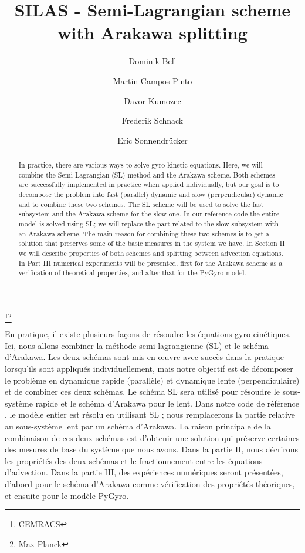 \documentclass[proc]{edpsmath}
\begin{document}
\title{SILAS - Semi-Lagrangian scheme with Arakawa splitting}
\thanks{CEMRACS}\thanks{Max-Planck}%
%
\author{Dominik Bell}\address{Max-Planck-Institut für Plasmaphysik, Garching, Germany; }
\author{Martin Campos Pinto}
\author{Davor Kumozec}\address{Faculty of Sciences, University of Novi Sad, Serbia; }
\author{Frederik Schnack}
\author{Eric Sonnendrücker}

\begin{abstract}
In practice, there are various ways to solve gyro-kinetic equations. Here, we will combine the Semi-Lagrangian (SL) method and the Arakawa scheme. Both schemes are successfully implemented in practice when applied individually, but our goal is to decompose the problem into fast (parallel) dynamic and slow (perpendicular) dynamic and to combine these two schemes. The SL scheme will be used to solve the fast subsystem and the Arakawa scheme for the slow one. In our reference code \cite{pygyro_code} the entire model is solved using SL; we will replace the part related to the slow subsystem with an Arakawa scheme. The main reason for combining these two schemes is to get a solution that preserves some of the basic measures in the system we have. In Section II we will describe properties of both schemes and splitting between advection equations. In Part III numerical experiments will be presented, first for the Arakawa scheme as a verification of theoretical properties, and after that for the PyGyro model.
\end{abstract}
%
\begin{resume}
En pratique, il existe plusieurs façons de résoudre les équations gyro-cinétiques. Ici, nous allons combiner la méthode semi-lagrangienne (SL) et le schéma d'Arakawa. Les deux schémas sont mis en œuvre avec succès dans la pratique lorsqu'ils sont appliqués individuellement, mais notre objectif est de décomposer le problème en dynamique rapide (parallèle) et dynamique lente (perpendiculaire) et de combiner ces deux schémas. Le schéma SL sera utilisé pour résoudre le sous-système rapide et le schéma d'Arakawa pour le lent. Dans notre code de référence \cite{pygyro_code}, le modèle entier est résolu en utilisant SL ; nous remplacerons la partie relative au sous-système lent par un schéma d'Arakawa. La raison principale de la combinaison de ces deux schémas est d'obtenir une solution qui préserve certaines des mesures de base du système que nous avons. Dans la partie II, nous décrirons les propriétés des deux schémas et le fractionnement entre les équations d'advection. Dans la partie III, des expériences numériques seront présentées, d'abord pour le schéma d'Arakawa comme vérification des propriétés théoriques, et ensuite pour le modèle PyGyro.
\end{resume}
\end{document}
